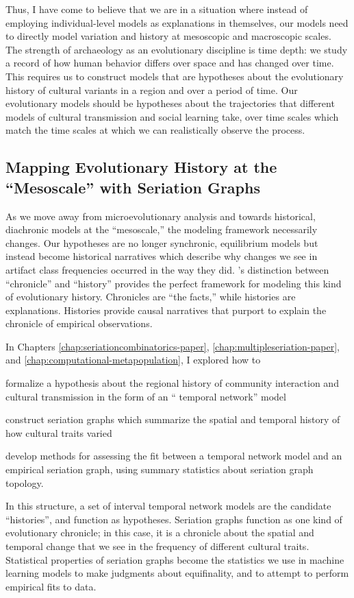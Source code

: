 Thus, I have come to believe that we are in a situation where instead of employing individual-level models as explanations in themselves, our models need to directly model variation and history at mesoscopic and macroscopic scales.  
The strength of archaeology as an evolutionary discipline is time depth:  we study a record of how human behavior differs over space and has changed over time.  This requires us to construct models that are hypotheses about the evolutionary history of cultural variants in a region and over a period of time.  Our evolutionary models should be hypotheses about the trajectories that different models of cultural transmission and social learning take, over time scales which match the time scales at which we can realistically observe the process.  


\subsection{Mapping Evolutionary History at the ``Mesoscale'' with Seriation Graphs}\label{conc:sec:conc-seriation}

As we move away from microevolutionary analysis and towards historical, diachronic models at the ``mesoscale,'' the modeling framework necessarily changes.  Our hypotheses are no longer synchronic, equilibrium models but instead become historical narratives which describe why changes we see in artifact class frequencies occurred in the way they did.  \citet{OHara1988}'s distinction between ``chronicle'' and ``history'' provides the perfect framework for modeling this kind of evolutionary history.  Chronicles are ``the facts,'' while histories are explanations.  Histories provide causal narratives that purport to explain the chronicle of empirical observations. 

In Chapters \ref{chap:seriationcombinatorics-paper}, \ref{chap:multipleseriation-paper}, and \ref{chap:computational-metapopulation}, I explored how to \begin{dissparalist}
\item formalize a hypothesis about the regional history of community interaction and cultural transmission in the form of an `` temporal network'' model
\item construct seriation graphs which summarize the spatial and temporal history of how cultural traits varied 
\item develop methods for assessing the fit between a temporal network model and an empirical seriation graph, using summary statistics about seriation graph topology.
\end{dissparalist}  In this structure, a set of interval temporal network models are the candidate ``histories'', and function as hypotheses.  Seriation graphs function as one kind of evolutionary chronicle; in this case, it is a chronicle about the spatial and temporal change that we see in the frequency of different cultural traits.  Statistical properties of seriation graphs become the statistics we use in machine learning models to make judgments about equifinality, and to attempt to perform empirical fits  to data. 

